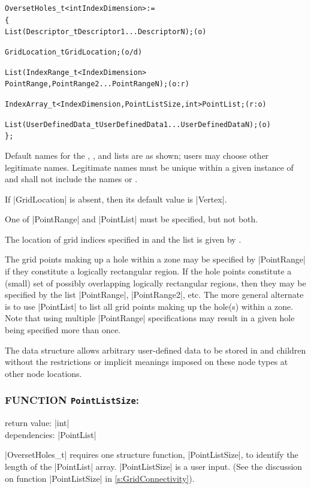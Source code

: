 \begin{alltt}
  OversetHoles\_t< int IndexDimension > :=
    \{
    List( Descriptor\_t Descriptor1 ... DescriptorN ) ;                      (o)

    GridLocation\_t GridLocation ;                                           (o/d)

    List( IndexRange\_t<IndexDimension> 
      PointRange, PointRange2 ... PointRangeN ) ;                           (o:r)

    IndexArray\_t<IndexDimension, PointListSize, int> PointList ;            (r:o)

    List( UserDefinedData\_t UserDefinedData1 ... UserDefinedDataN ) ;       (o)
    \} ;
\end{alltt}

\begin{notes}
\item
 Default names for the , , and
 lists are as shown; users may choose other legitimate names.
 Legitimate names must be unique 
 within a given instance of  and shall not include the
 names  or .
\item
 If |GridLocation| is absent, then its default value is |Vertex|.
\item
 One of |PointRange| and |PointList| must be specified, but not both.
\end{notes}

The location of grid indices specified in  and the
 list is given by .

The grid points making up a hole within a zone may be specified by
|PointRange| if they constitute a logically rectangular region.  If the hole
points constitute a (small) set of possibly overlapping logically rectangular
regions, then they may be specified by the list |PointRange|, |PointRange2|,
etc.  The more general alternate is to use |PointList| to list all grid
points making up the hole(s) within a zone.
Note that using multiple |PointRange| specifications may result in a
given hole being specified more than once.

The  data structure allows arbitrary
user-defined data to be stored in  and
 children without the restrictions or implicit
meanings imposed on these node types at other node locations.

\subsubsection*{FUNCTION \texttt{PointListSize}:}

\noindent return value: |int| \\
\noindent dependencies: |PointList|

|OversetHoles_t| requires one structure function, |PointListSize|, to 
identify the length of the |PointList| array.
|PointListSize| is a user input.
(See the discussion on function |PointListSize| in
\autoref{s:GridConnectivity}).
